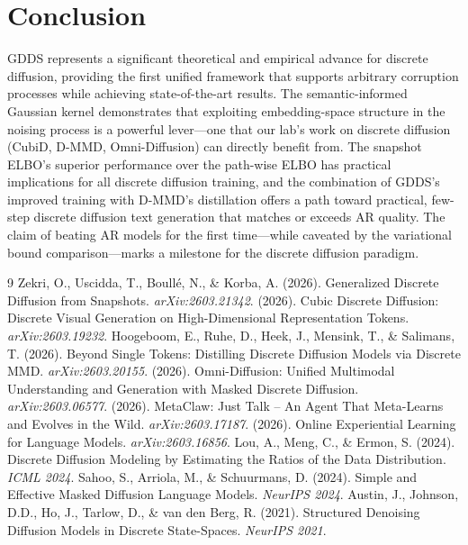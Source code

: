 \documentclass[11pt]{article}
\begin{document}
\section{Conclusion}

GDDS represents a significant theoretical and empirical advance for discrete diffusion, providing the first unified framework that supports arbitrary corruption processes while achieving state-of-the-art results. The semantic-informed Gaussian kernel demonstrates that exploiting embedding-space structure in the noising process is a powerful lever---one that our lab's work on discrete diffusion (CubiD, D-MMD, Omni-Diffusion) can directly benefit from. The snapshot ELBO's superior performance over the path-wise ELBO has practical implications for all discrete diffusion training, and the combination of GDDS's improved training with D-MMD's distillation offers a path toward practical, few-step discrete diffusion text generation that matches or exceeds AR quality. The claim of beating AR models for the first time---while caveated by the variational bound comparison---marks a milestone for the discrete diffusion paradigm.

\begin{thebibliography}{9}
 Zekri, O., Uscidda, T., Boull\'{e}, N., \& Korba, A. (2026). Generalized Discrete Diffusion from Snapshots. \textit{arXiv:2603.21342}.
 (2026). Cubic Discrete Diffusion: Discrete Visual Generation on High-Dimensional Representation Tokens. \textit{arXiv:2603.19232}.
 Hoogeboom, E., Ruhe, D., Heek, J., Mensink, T., \& Salimans, T. (2026). Beyond Single Tokens: Distilling Discrete Diffusion Models via Discrete MMD. \textit{arXiv:2603.20155}.
 (2026). Omni-Diffusion: Unified Multimodal Understanding and Generation with Masked Discrete Diffusion. \textit{arXiv:2603.06577}.
 (2026). MetaClaw: Just Talk -- An Agent That Meta-Learns and Evolves in the Wild. \textit{arXiv:2603.17187}.
 (2026). Online Experiential Learning for Language Models. \textit{arXiv:2603.16856}.
 Lou, A., Meng, C., \& Ermon, S. (2024). Discrete Diffusion Modeling by Estimating the Ratios of the Data Distribution. \textit{ICML 2024}.
 Sahoo, S., Arriola, M., \& Schuurmans, D. (2024). Simple and Effective Masked Diffusion Language Models. \textit{NeurIPS 2024}.
 Austin, J., Johnson, D.D., Ho, J., Tarlow, D., \& van den Berg, R. (2021). Structured Denoising Diffusion Models in Discrete State-Spaces. \textit{NeurIPS 2021}.
\end{thebibliography}
\end{document}
